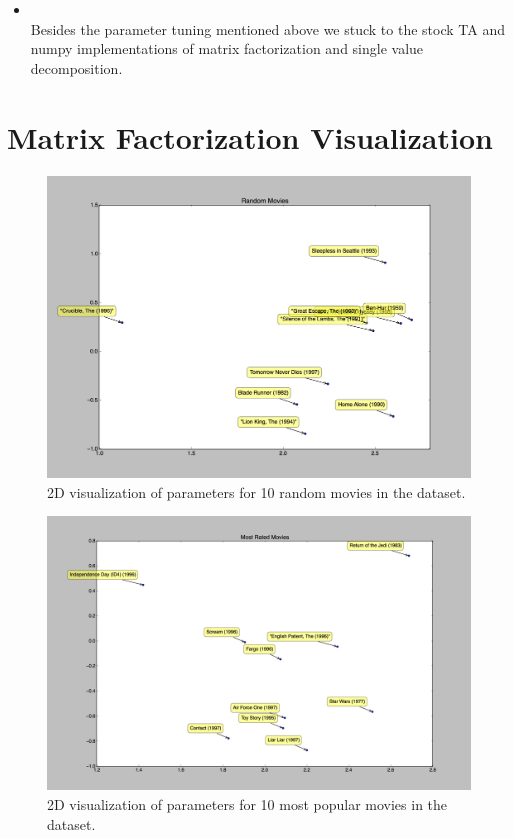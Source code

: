 \begin{itemize}
    \item {} \\

    Besides the parameter tuning mentioned above we stuck to the stock TA and numpy
    implementations of matrix factorization and single value decomposition.
\end{itemize}


\pagebreak
\section{Matrix Factorization Visualization}
\medskip

\begin{figure}[H]
\centering
\includegraphics[width=\textwidth]{random_2d_vis}
\caption{2D visualization of parameters for 10 random movies in the dataset.}
\end{figure}


\pagebreak

\begin{figure}[H]
\centering
\includegraphics[width=\textwidth]{popular_2d_vis}
\caption{2D visualization of parameters for 10 most popular movies in the dataset.}
\end{figure}



